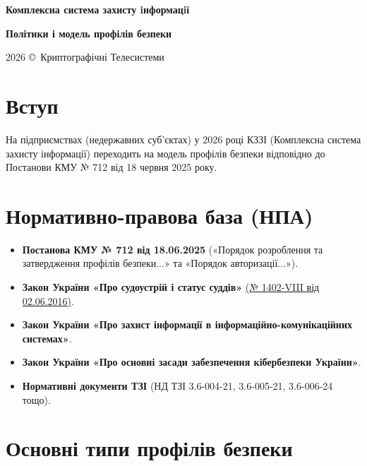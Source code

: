 \documentclass{article}
\newcommand\HUGE[1]{\fontsize{40}{40}\selectfont #1}
\begin{document}
\pagestyle{fancy}

\begin{titlepage}
  \AddToShipoutPictureBG*{\AtPageLowerLeft{\color{nato}\rule{\paperwidth}{\paperheight}}}
  \color{white}\thispagestyle{empty}\vspace*{4cm}\centering
  {\Huge  \textbf{Комплексна система захисту iнформацiї} \par} \vspace{2cm}
  {\HUGE  \textbf{Політики і модель профілів безпеки} \par} \vspace{2.5cm}
  \vfill
  {\large 2026 \copyright\ Криптографічні Телесистеми \par}
\end{titlepage}

\newpage

\tableofcontents

\section{Вступ}

На підприємствах (недержавних суб’єктах) у 2026 році КЗЗІ (Комплексна система захисту інформації) переходить
на модель профілів безпеки відповідно до Постанови КМУ № 712 від 18 червня 2025 року.

\section{Нормативно-правова база (НПА)}

\begin{itemize}
    \item \textbf{Постанова КМУ № 712 від 18.06.2025} («Порядок розроблення та затвердження профілів безпеки...» та «Порядок авторизації...»).
    \item \textbf{Закон України «Про судоустрій і статус суддів»} \href{https://zakon.rada.gov.ua/laws/show/1402-19}{(№ 1402-VIII від 02.06.2016)}.
    \item \textbf{Закон України «Про захист інформації в інформаційно-комунікаційних системах»}.
    \item \textbf{Закон України «Про основні засади забезпечення кібербезпеки України»}.
    \item \textbf{Нормативні документи ТЗІ} (НД ТЗІ 3.6-004-21, 3.6-005-21, 3.6-006-24 тощо).
\end{itemize}

\section{Основні типи профілів безпеки}
\end{document}
